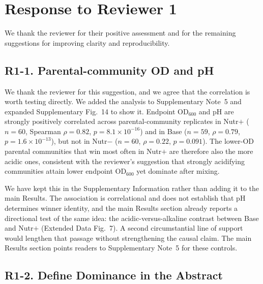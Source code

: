 \section*{Response to Reviewer 1}

We thank the reviewer for their positive assessment and for the remaining suggestions for improving clarity and reproducibility.

\subsection*{R1-1. Parental-community OD and pH}


We thank the reviewer for this suggestion, and we agree that the correlation is worth testing directly. We added the analysis to Supplementary Note~5 and expanded Supplementary Fig.~14 to show it. Endpoint OD$_{600}$ and pH are strongly positively correlated across parental-community replicates in Nutr$+$ ($n = 60$, Spearman $\rho = 0.82$, $p = 8.1 \times 10^{-16}$) and in Base ($n = 59$, $\rho = 0.79$, $p = 1.6 \times 10^{-13}$), but not in Nutr$-$ ($n = 60$, $\rho = 0.22$, $p = 0.091$). The lower-OD parental communities that win most often in Nutr$+$ are therefore also the more acidic ones, consistent with the reviewer's suggestion that strongly acidifying communities attain lower endpoint OD$_{600}$ yet dominate after mixing.

We have kept this in the Supplementary Information rather than adding it to the main Results. The association is correlational and does not establish that pH determines winner identity, and the main Results section already reports a directional test of the same idea: the acidic-versus-alkaline contrast between Base and Nutr$+$ (Extended Data Fig.~7). A second circumstantial line of support would lengthen that passage without strengthening the causal claim. The main Results section points readers to Supplementary Note~5 for these controls.

\subsection*{R1-2. Define Dominance in the Abstract}

